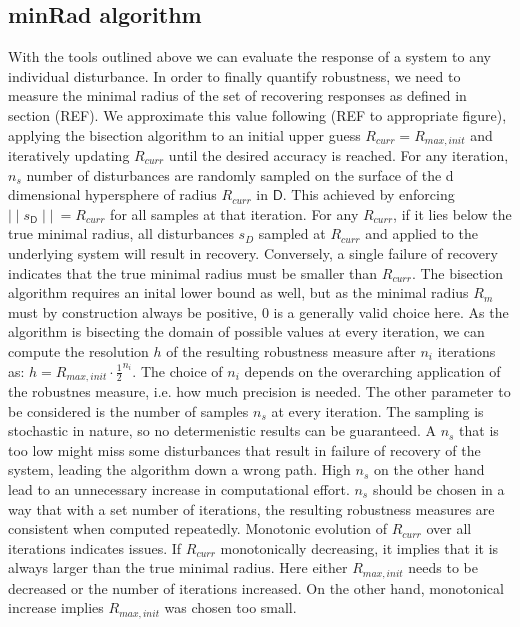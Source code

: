
\subsection{minRad algorithm}
    


    With the tools outlined above we can evaluate the response of a system to any individual disturbance. In order to finally quantify robustness, we need to measure the minimal radius of the set of recovering responses as defined in section (REF). We approximate this value following (REF to appropriate figure), applying the bisection algorithm to an initial upper guess $R_{curr} =  R_{max,init}$ and iteratively updating $R_{curr}$ until the desired accuracy is reached. For any iteration, $n_{s}$ number of disturbances are randomly sampled on the surface of the d dimensional hypersphere of radius $R_{curr}$ in $\mathsf{D}$. This achieved by enforcing $\mid\mid s_{\mathsf{D}}\mid\mid\ = R_{curr}$ for all samples at that iteration. For any $R_{curr}$, if it lies below the true minimal radius, all disturbances ${s_D}$ sampled at $R_{curr}$ and applied to the underlying system will result in recovery. Conversely, a single failure of recovery indicates that the true minimal radius must be smaller than $R_{curr}$. The bisection algorithm requires an inital lower bound as well, but as the minimal radius $R_m$ must by construction always be positive, 0 is a generally valid choice here. 
    As the algorithm is bisecting the domain of possible values at every iteration, we can compute the resolution $h$ of the resulting robustness measure after $n_i$ iterations as: $h = R_{max,init}\cdot\frac{1}{2}^{n_i}$. The choice of $n_i$ depends on the overarching application of the robustnes measure, i.e. how much precision is needed.
    The other parameter to be considered is the number of samples $n_{s}$ at every iteration. The sampling is stochastic in nature, so no determenistic results can be guaranteed. A $n_{s}$ that is too low might miss some disturbances that result in failure of recovery of the system, leading the algorithm down a wrong path. High $n_{s}$ on the other hand lead to an unnecessary increase in computational effort. 
    $n_{s}$ should be chosen in a way that with a set number of iterations, the resulting robustness measures are consistent when computed repeatedly. 
    Monotonic evolution of $R_{curr}$ over all iterations indicates issues. If $R_{curr}$ monotonically decreasing, it implies that it is always larger than the true minimal radius. Here either $R_{max,init}$ needs to be decreased or the number of iterations increased. On the other hand, monotonical increase implies $R_{max,init}$ was chosen too small.

